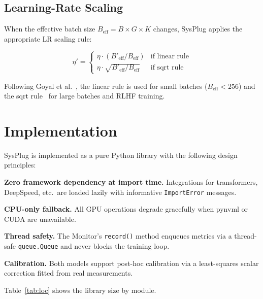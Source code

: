 \documentclass[10pt,twocolumn]{article}
\begin{document}
\subsection{Learning-Rate Scaling}

When the effective batch size $B_\text{eff} = B \times G \times K$ changes,
SysPlug applies the appropriate LR scaling rule:

\begin{equation}
\eta' = \begin{cases}
  \eta \cdot (B'_\text{eff} / B_\text{eff}) & \text{if linear rule} \\
  \eta \cdot \sqrt{B'_\text{eff} / B_\text{eff}} & \text{if sqrt rule}
\end{cases}
\end{equation}

Following Goyal et al.~\cite{goyal2017accurate}, the linear rule is used for
small batches ($B_\text{eff} < 256$) and the sqrt rule~\cite{krizhevsky2014one}
for large batches and RLHF training.

\section{Implementation}

SysPlug is implemented as a pure Python library with the following design
principles:

\textbf{Zero framework dependency at import time.}  Integrations for
transformers, DeepSpeed, etc.\ are loaded lazily with informative
\texttt{ImportError} messages.

\textbf{CPU-only fallback.}  All GPU operations degrade gracefully when
pynvml or CUDA are unavailable.

\textbf{Thread safety.}  The Monitor's \texttt{record()} method enqueues
metrics via a thread-safe \texttt{queue.Queue} and never blocks the training loop.

\textbf{Calibration.}  Both models support post-hoc calibration via a
least-squares scalar correction fitted from real measurements.

Table~\ref{tab:loc} shows the library size by module.
\end{document}
